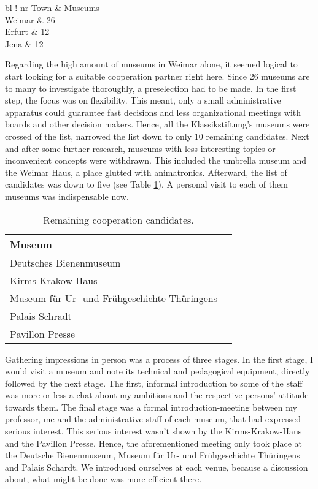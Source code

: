 \begin{table}[h]
	\centering
	\begin{tabular}{ bl !{\vrule width 1pt} nr }
		\rowstyle{\bfseries}
		Town		& Museums \\
		\toprule
		Weimar	& 26 \\ 
		Erfurt 	& 12 \\ 
		Jena 		& 12 \\ 
	\end{tabular}
	\caption{Museums in and around Weimar.}
	\label{tab:museums_amounts}
\end{table}

Regarding the high amount of museums in Weimar alone, it seemed logical to start looking for a suitable cooperation partner right here. Since 26 museums are to many to investigate thoroughly, a preselection had to be made. In the first step, the focus was on flexibility. This meant, only a small administrative apparatus could guarantee fast decisions and less organizational meetings with boards and other decision makers. Hence, all the Klassikstiftung's museums were crossed of the list, narrowed the list down to only 10 remaining candidates. Next and after some further research, museums with less interesting topics or inconvenient concepts were withdrawn. This included the umbrella museum and the Weimar Haus, a place glutted with animatronics. Afterward, the list of candidates was down to five (see Table \ref{tab:museums_finalists}). A personal visit to each of them museums was indispensable now.

\begin{table}[h]
	\centering
	\begin{tabular}{ bl }
		\rowstyle{\bfseries}
		Museum \\
		\toprule
		Deutsches Bienenmuseum \\
		Kirms-Krakow-Haus \\
		Museum für Ur- und Frühgeschichte Thüringens \\ 
		Palais Schradt \\
		Pavillon Presse \\
	\end{tabular}
	\caption{Remaining cooperation candidates.}
	\label{tab:museums_finalists}
\end{table}

Gathering impressions in person was a process of three stages. In the first stage, I would visit a museum and note its technical and pedagogical equipment, directly followed by the next stage. The first, informal introduction to some of the staff was more or less a chat about my ambitions and the respective persons' attitude towards them. The final stage was a formal introduction-meeting between my professor, me and the administrative staff of each museum, that had expressed serious interest. This serious interest wasn't shown by the Kirms-Krakow-Haus and the Pavillon Presse. Hence, the aforementioned meeting only took place at the Deutsche Bienenmuseum, Museum für Ur- und Frühgeschichte Thüringens and Palais Schardt. We introduced ourselves at each venue, because a discussion about, what might be done was more efficient there.  

